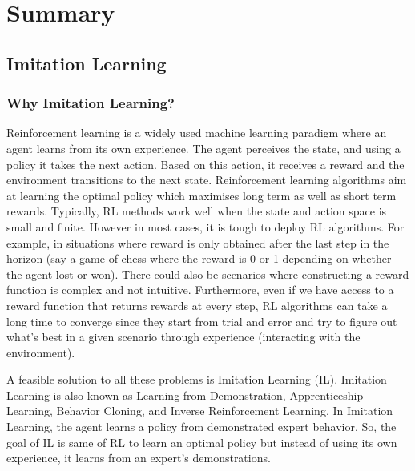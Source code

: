 \documentclass[11pt]{article}
\begin{document}
\begin{itemize}
\end{itemize}


        

\section{Summary}
\subsection{Imitation Learning}
\subsubsection{Why Imitation Learning?}


Reinforcement learning is a widely used machine learning paradigm where an agent learns from its own experience. The agent perceives the state, and using a policy it takes the next action. Based on this action, it receives a reward and the environment transitions to the next state. Reinforcement learning algorithms aim at learning the optimal policy which maximises long term as well as short term rewards. Typically, RL methods work well when the state and action space is small and finite. However in most cases, it is tough to deploy RL algorithms. For example, in situations where reward is only obtained after the last step in the horizon (say a game of chess where the reward is 0 or 1 depending on whether the agent lost or won). There could also be scenarios where constructing a reward function is complex and not intuitive. Furthermore, even if we have access to a reward function that returns rewards at every step, RL algorithms can take a long time to converge since they start from trial and error and try to figure out what's best in a given scenario through experience (interacting with the environment).

A feasible solution to all these problems is Imitation Learning (IL). Imitation Learning is also known as Learning from Demonstration, Apprenticeship Learning, Behavior Cloning, and Inverse Reinforcement Learning. In Imitation Learning, the agent learns a policy from demonstrated expert behavior. So, the goal of IL is same of RL to learn an optimal policy but instead of using its own experience, it learns from an expert's demonstrations.
\end{document}
